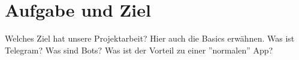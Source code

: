 \chapter{Aufgabe und Ziel}
Welches Ziel hat unsere Projektarbeit?
Hier auch die Basics erwähnen. Was ist Telegram? Was sind Bots? Was ist der Vorteil zu einer ''normalen'' App?

